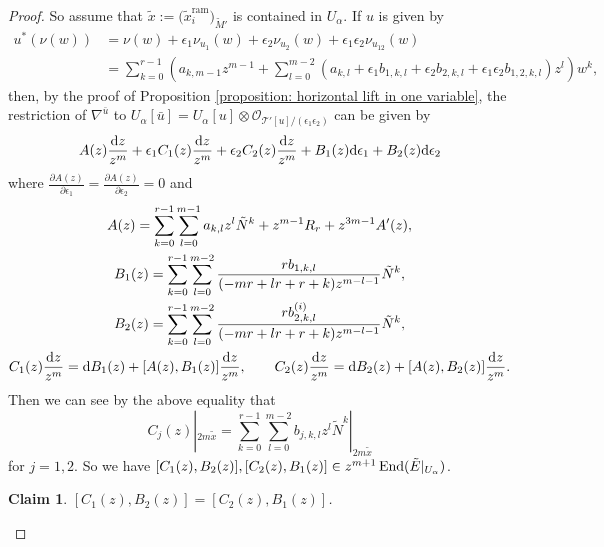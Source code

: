 \documentclass[pdftex]{sigma}
\numberwithin{equation}{section}
\newtheorem{Claim}[Theorem]{Claim}
\newcommand\End{\mathop{\rm End}\nolimits}
\begin{document}
\begin{proof}
So assume that $\tilde{x}:=\big(\tilde{x}_i^{\mathrm{ram}}\big)_{\tilde{M}'}$
is contained in $U_{\alpha}$.
If $u$ is given by
\begin{align*}
 u^*(\nu(w))
 &=
 \nu(w) + \epsilon_1 \nu_{u_1}(w)
 +\epsilon_2 \nu_{u_2}(w) +\epsilon_1\epsilon_2 \nu_{u_{12}}(w)
 \\
 &=
 \sum_{k=0}^{r-1}\left( a_{k,m-1} z^{m-1}
 +\sum_{l=0}^{m-2} ( a_{k,l} + \epsilon_1 b_{1,k,l}
 +\epsilon_2 b_{2,k,l} +\epsilon_1\epsilon_2 b_{1,2,k,l} ) z^l \right)w^k,
\end{align*}
then, by the proof of Proposition \ref{proposition: horizontal lift in one variable},
the restriction of $\nabla^{\bar{u}}$ to
$U_{\alpha}[\bar{u}]=U_{\alpha}[u]\otimes{\mathcal O}_{{\mathcal T'}[u]/(\epsilon_1\epsilon_2)}$
can be given by
\[
 A(z)\frac{{\rm d}z} {z^m}
 +\epsilon_1C_1(z)\frac{{\rm d}z} {z^m}
 +\epsilon_2C_2(z)\frac{{\rm d}z} {z^m}
 +B_1(z) {\rm d}\epsilon_1+B_2(z){\rm d}\epsilon_2
\]
where $\frac{\partial A(z)} {\partial\epsilon_1}=\frac {\partial A(z)} {\partial \epsilon_2}=0$
and
\begin{gather}
 A(z)
 =
 \sum_{k=0}^{r-1} \sum_{l=0}^{m-1} a_{k,l} z^l \tilde{N}^k
 + z^{m-1}R_r+z^{3m-1}A'(z),
 \label{equation: assumption of A(z)} \\
 B_1(z) =
 \sum_{k=0}^{r-1} \sum_{l=0}^{m-2}
 \frac {rb_{1,k,l}} {(-mr+lr+r+k)z^{m-l-1}} \tilde{N}^k,
 \notag \\
 B_2(z)
 =
 \sum_{k=0}^{r-1} \sum_{l=0}^{m-2}
 \frac {rb^{(i)}_{2,k,l}} {(-mr+lr+r+k)z^{m-l-1}} \tilde{N}^k,
 \notag \\
 C_1(z)\frac{{\rm d}z}{z^m}
 =
 {\rm d}B_1(z)+[A(z),B_1(z)]\frac{{\rm d}z}{z^m},
 \qquad
 C_2(z)\frac{{\rm d}z} {z^m}
 = {\rm d}B_2(z)+[A(z),B_2(z)]\frac{{\rm d}z} {z^m}.
 \notag
\end{gather}
Then we can see by the above equality that
\[
 C_j(z)|_{2m\tilde{x}}
 =
 \sum_{k=0}^{r-1} \sum_{l=0}^{m-2}
 b_{j,k,l} z^l \tilde{N}^k|_{2m\tilde{x}}
\]
for $j=1,2$.
So we have
$[C_1(z),B_2(z)],
[C_2(z),B_1(z)]
\in z^{m+1}\End(\tilde{E}|_{U_{\alpha}})$.

\begin{Claim}
$[C_1(z),B_2(z)]=[C_2(z),B_1(z)]$.
\end{Claim}


\end{proof}
\end{document}
